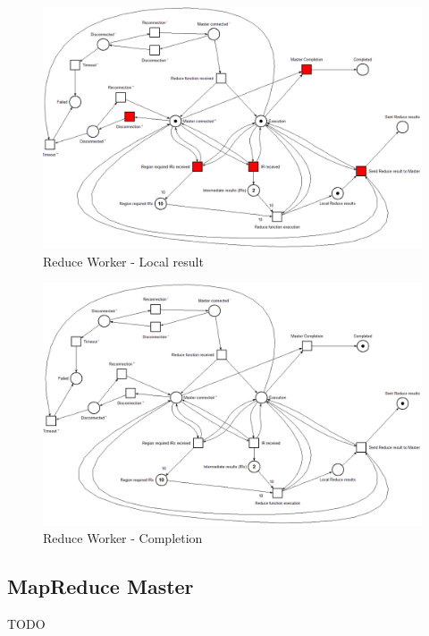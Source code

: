 \begin{figure}[!ht]
    \centering
    \includegraphics[width=\linewidth]{document/chapters/chapter_6/images/reduce_worker_petri_net_1.png}
    \caption{Reduce Worker - Local result}
    \label{fig:reduce_worker_petri_net_1}
\end{figure}

\begin{figure}[!ht]
    \centering
    \includegraphics[width=\linewidth]{document/chapters/chapter_6/images/reduce_worker_petri_net_2.png}
    \caption{Reduce Worker - Completion}
    \label{fig:reduce_worker_petri_net_2}
\end{figure}

\subsection{MapReduce Master}
TODO

